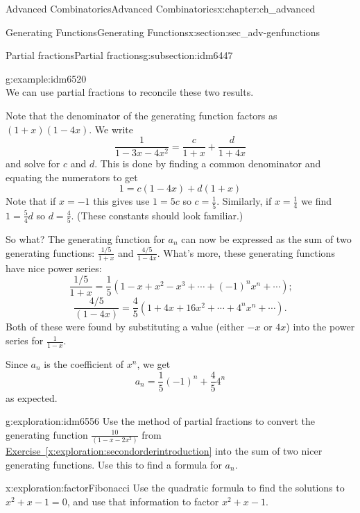 \documentclass[oneside,10pt,]{book}
\numberwithin{equation}{chapter}
\begin{document}
\begin{chapterptx}{Advanced Combinatorics}{}{Advanced Combinatorics}{}{}{x:chapter:ch_advanced}
\begin{sectionptx}{Generating Functions}{}{Generating Functions}{}{}{x:section:sec_adv-genfunctions}
\begin{subsectionptx}{Partial fractions}{}{Partial fractions}{}{}{g:subsection:idm6447}
\begin{example}{}{g:example:idm6520}
\begin{equation*}
\end{equation*}
We can use partial fractions to reconcile these two results.%
\par
Note that the denominator of the generating function factors as \((1+x)(1-4x)\).  We write%
\begin{equation*}
\frac{1}{1-3x-4x^2} = \frac{c}{1+x}+\frac{d}{1+4x}
\end{equation*}
and solve for \(c\) and \(d\).  This is done by finding a common denominator and equating the numerators to get%
\begin{equation*}
1 = c(1-4x) + d(1+x)
\end{equation*}
Note that if \(x = -1\) this gives use \(1 = 5c\) so \(c = \frac{1}{5}\).  Similarly, if \(x = \frac{1}{4}\) we find \(1 = \frac{5}{4}d\) so \(d = \frac{4}{5}\).  (These constants should look familiar.)%
\par
So what?  The generating function for \(a_n\) can now be expressed as the sum of two generating functions: \(\frac{1/5}{1+x}\) and \(\frac{4/5}{1-4x}\).  What's more, these generating functions have nice power series:%
\begin{equation*}
\frac{1/5}{1+x} = \frac{1}{5}\left( 1-x+x^2-x^3+\cdots +(-1)^nx^n+\cdots\right)\text{;}
\end{equation*}
%
\begin{equation*}
\frac{4/5}{(1-4x)} = \frac{4}{5} \left(1+4x + 16x^2 + \cdots + 4^nx^n+ \cdots \right)\text{.}
\end{equation*}
Both of these were found by substituting a value (either \(-x\) or \(4x\)) into the power series for \(\frac{1}{1-x}\).%
\par
Since \(a_n\) is the coefficient of \(x^n\), we get%
\begin{equation*}
a_n = \frac{1}{5}(-1)^n + \frac{4}{5}4^n
\end{equation*}
as expected.%
\end{example}
\begin{exploration}{}{g:exploration:idm6556}%
Use the method of partial fractions to convert the generating function \(\frac{10}{(1-x-2x^2)}\) from \hyperref[x:exploration:secondorderintroduction]{Exercise~\ref{x:exploration:secondorderintroduction}} into the sum of two nicer generating functions. Use this to find a formula for \(a_n\).%
\end{exploration}
\begin{exploration}{}{x:exploration:factorFibonacci}%
Use the quadratic formula to find the solutions to \(x^2+x-1=0\), and use that information to factor \(x^2+x-1\).%

\end{exploration}
\end{subsectionptx}
\end{sectionptx}
\end{chapterptx}
\end{document}
